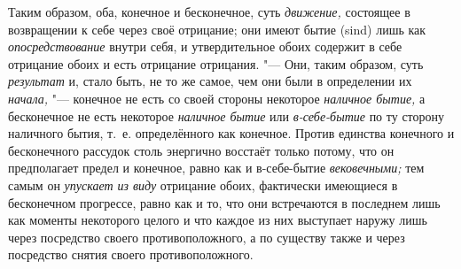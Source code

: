 Таким образом, оба, конечное и бесконечное, суть
{\em движение,} состоящее в возвращении к себе через
своё отрицание; они имеют бытие (sind) лишь как
{\em опосредствование} внутри себя, и утвердительное
обоих содержит в себе отрицание обоих и есть отрицание отрицания. "--- Они,
таким образом, суть {\em результат} и, стало быть, не
то же самое, чем они были в определении их
{\em начала,} "--- конечное не есть со своей стороны
некоторое {\em наличное бытие,} а бесконечное не есть
некоторое {\em наличное бытие} или
{\em в-себе-бытие} по ту сторону наличного бытия, т.~е.
определённого как конечное. Против единства конечного и бесконечного
рассудок столь энергично восстаёт только потому, что он предполагает предел
и конечное, равно как и в-себе-бытие {\em вековечными;}
тем самым он {\em упускает из виду} отрицание обоих,
фактически имеющиеся в бесконечном прогрессе, равно как и то, что они
встречаются в последнем лишь как моменты некоторого целого и что каждое из
них выступает наружу лишь через посредство своего противоположного, а по
существу также и через посредство снятия своего противоположного.

